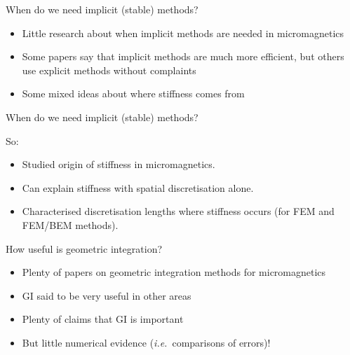 \documentclass[18pt]{beamer}
\newlength{\wideitemsep}
\let\olditem\item
\renewcommand{\item}{\setlength{\itemsep}{\wideitemsep}\olditem}
\begin{document}
\begin{frame}{When do we need implicit (stable) methods?}

  \begin{itemize}
  \item Little research about when implicit methods are needed in micromagnetics
  \item Some papers say that implicit methods are much more efficient, but others use explicit methods without complaints
  \item Some mixed ideas about where stiffness comes from
  \end{itemize}

\end{frame}

\begin{frame}{When do we need implicit (stable) methods?}

  So:
  \begin{itemize}
  \item Studied origin of stiffness in micromagnetics.
  \item Can explain stiffness with spatial discretisation alone.
  \item Characterised discretisation lengths where stiffness occurs (for
    FEM and FEM/BEM methods).
  \end{itemize}

\end{frame}



\begin{frame}{How useful is geometric integration?}

  \begin{itemize}
  \item Plenty of papers on geometric integration methods for micromagnetics
  \item GI said to be very useful in other areas
  \item Plenty of claims that GI is important
  \item But little numerical evidence (\textit{i.e.}\ comparisons of errors)!
  \end{itemize}

\end{frame}
\end{document}
